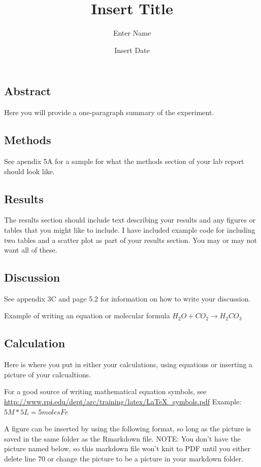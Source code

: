 \documentclass[]{article}
\title{Insert Title}
\author{Enter Name}
\date{Insert Date}
\begin{document}
\maketitle

\subsection{Abstract}\label{abstract}

Here you will provide a one-paragraph summary of the experiment.

\subsection{Methods}\label{methods}

See apendix 5A for a sample for what the methods section of your lab
report should look like.

\subsection{Results}\label{results}

The results section should include text describing your results and any
figures or tables that you might like to include. I have included
example code for including two tables and a scatter plot as part of your
results section. You may or may not want all of these.

\subsection{Discussion}\label{discussion}

See appendix 3C and page 5.2 for information on how to write your
discussion.

Example of writing an equation or molecular formula
\(H_2O + CO_2 \rightarrow H_2CO_3\)

\subsection{Calculation}\label{calculation}

Here is where you put in either your calculations, using equations or
inserting a picture of your calcualtions.

For a good source of writing mathematical equation symbols, see
\url{http://www.rpi.edu/dept/arc/training/latex/LaTeX_symbols.pdf}
Example: \(5M*5L=5 moles Fe\)

A figure can be inserted by using the following format, so long as the
picture is saved in the same folder as the Rmarkdown file. NOTE: You
don't have the picture named below, so this markdown file won't knit to
PDF until you either delete line 70 or change the picture to be a
picture in your markdown folder.
\end{document}
